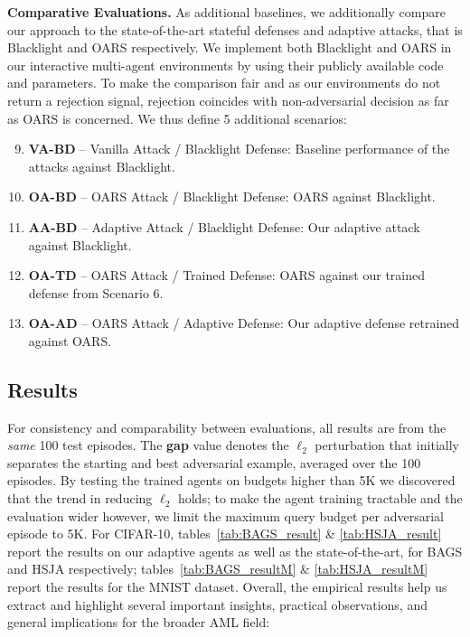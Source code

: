 \textbf{Comparative Evaluations.} As additional baselines, we additionally compare our approach to the state-of-the-art stateful defenses and adaptive attacks, that is Blacklight \cite{li2022blacklight} and OARS \cite{feng2023stateful} respectively.
We implement both Blacklight and OARS in our interactive multi-agent environments by using their publicly available code and parameters.
To make the comparison fair and as our environments do not return a rejection signal, rejection coincides with non-adversarial decision as far as OARS is concerned.
We thus define 5 additional scenarios:

\begin{enumerate}[leftmargin=*]
\setcounter{enumi}{8} 
    \setlength\itemsep{0.1em}
    \item \textbf{VA-BD} -- Vanilla Attack / Blacklight Defense: Baseline performance of the attacks against Blacklight.
    \item \textbf{OA-BD} -- OARS Attack / Blacklight Defense: OARS against Blacklight.
    \item \textbf{AA-BD} -- Adaptive Attack / Blacklight Defense: Our adaptive attack against Blacklight.
    \item \textbf{OA-TD} -- OARS Attack / Trained Defense: OARS against our trained defense from Scenario 6.
    \item \textbf{OA-AD} -- OARS Attack / Adaptive Defense: Our adaptive defense retrained against OARS.
\end{enumerate}


\subsection{Results}
For consistency and comparability between evaluations, all results are from the \emph{same} 100 test episodes.
The \textbf{gap} value denotes the $\ell_2$ perturbation that initially separates the starting and best adversarial example, averaged over the 100 episodes. 
By testing the trained agents on budgets higher than 5K we discovered that the trend in reducing $\ell_2$ holds; to make the agent training tractable and the evaluation wider however, we limit the maximum query budget per adversarial episode to 5K.
For CIFAR-10, tables~\ref{tab:BAGS_result} \& \ref{tab:HSJA_result} report the results on our adaptive agents as well as the state-of-the-art, for BAGS and HSJA respectively; tables~\ref{tab:BAGS_resultM} \& \ref{tab:HSJA_resultM} report the results for the MNIST dataset. 
Overall, the empirical results 
help us extract and highlight several important insights, practical observations, and general implications for the broader \gls{AML} field:

